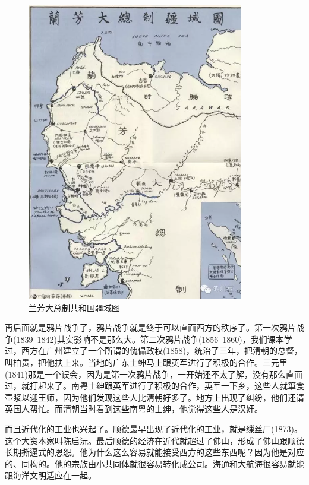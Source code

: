 \begin{figure}
	\centering
	\includegraphics[width=\textwidth]{images/image-68}
	\caption{兰芳大总制共和国疆域图}
\end{figure}

再后面就是鸦片战争了，鸦片战争就是终于可以直面西方的秩序了。第一次鸦片战争(1839~1842)其实影响不是那么大。第二次鸦片战争(1856~1860)，我们课本学过，西方在广州建立了一个所谓的傀儡政权(1858)，统治了三年，把清朝的总督，叫柏贵，把他扶上来。当地的广东士绅马上跟英军进行了积极的合作。三元里(1841)那是一个误会，因为是第一次鸦片战争，一开始还不太了解，没有那么直面过，就打起来了。南粤士绅跟英军进行了积极的合作，英军一下乡，这些人就箪食壶浆以迎王师，因为他们发现这些人比清朝好多了。地方上出现了纠纷，他们还请英国人帮忙。而清朝当时看到这些南粤的士绅，他觉得这些人是汉奸。

而且近代化的工业也兴起了。顺德最早出现了近代化的工业，就是缫丝厂(1873)。这个大资本家叫陈启沅。最后顺德的经济在近代就超过了佛山，形成了佛山跟顺德长期撕逼式的恩怨。他为什么这么容易就能接受西方的这些东西呢？因为他是对应的、同构的。他的宗族由小共同体就很容易转化成公司。海通和大航海很容易就能跟海洋文明适应在一起。


